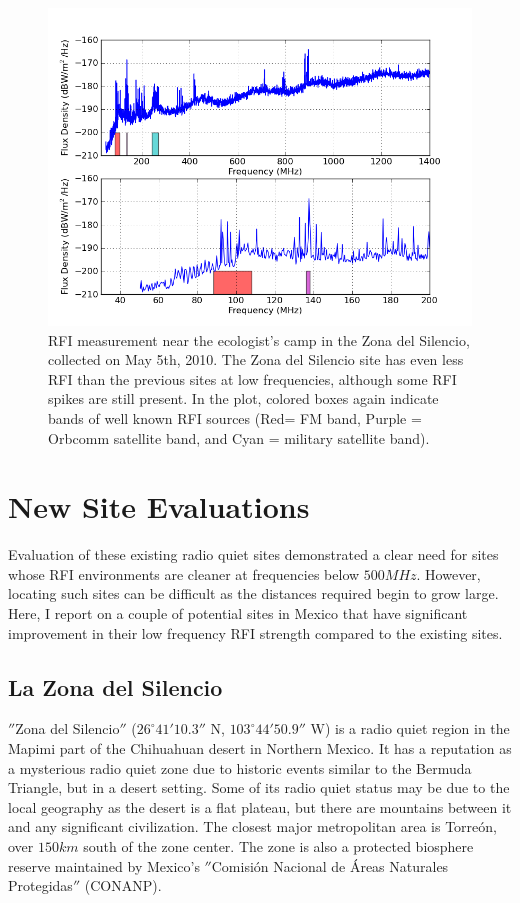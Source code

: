 \begin{figure}[htb]
\begin{center}
\includegraphics[width=0.9\linewidth]{RFI_testing/figures/ZdS_halfway_in_bands.png}
\caption{RFI measurement near the ecologist's camp in the Zona del Silencio, collected on May 5th, 2010. The Zona del Silencio site has even less RFI than the previous sites at low frequencies, although some RFI spikes are still present. In the plot, colored boxes again indicate bands of well known RFI sources (Red= FM band, Purple = Orbcomm satellite band, and Cyan = military satellite band).}
\label{Fig:zdsendrfi}
\end{center}
\end{figure}



\section{New Site Evaluations}

Evaluation of these existing radio quiet sites demonstrated a clear need for sites whose RFI environments are cleaner at frequencies below $500 MHz$. However, locating such sites can be difficult as the distances required begin to grow large. Here, I report on a couple of potential sites in Mexico that have significant improvement in their low frequency RFI strength compared to the existing sites. 


\subsection{La Zona del Silencio}

$''$Zona del Silencio$''$ ($26^\circ 41' 10.3''$ N, $103^\circ 44' 50.9''$ W) is a radio quiet region in the Mapimi part of the Chihuahuan desert in Northern Mexico. It has a reputation as a mysterious radio quiet zone due to historic events similar to the Bermuda Triangle, but in a desert setting. Some of its radio quiet status may be due to the local geography as the desert is a flat plateau, but there are mountains between it and any significant civilization. The closest major metropolitan area is Torre\'{o}n, over $150 km$ south of the zone center. The zone is also a protected biosphere reserve maintained by Mexico's $''$Comisi\'{o}n Nacional de \'{A}reas Naturales Protegidas$''$ (CONANP). 


